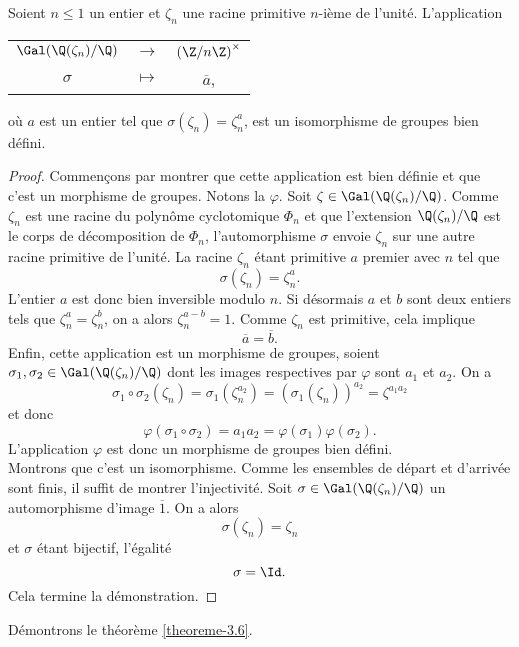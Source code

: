 \begin{lemme}\label{iso-Z/nZ*}
	Soient $n \leq 1$ un entier et $\zeta_n$ une racine primitive $n$-ième de l'unité. L'application 
\begin{center}
	\begin{tabular}{ccc}
		$\Gal(\Q(\zeta_n)/\Q)$ & $\longrightarrow$ & $\left(\Z/n\Z\right)^\times$ \\
		$\sigma$	& $\longmapsto$ & $\overline{a}$,
	\end{tabular}
\end{center}
où $a$ est un entier tel que $\sigma(\zeta_n) = \zeta_n^a$, est un isomorphisme de groupes bien défini.
\end{lemme}

\begin{proof}
	Commençons par montrer que cette application est bien définie et que c'est un morphisme de groupes. Notons la $\varphi$. Soit $\zeta\in \Gal(\Q(\zeta_n)/\Q)$. Comme $\zeta_n$ est une racine du polynôme cyclotomique $\Phi_n$ et que l'extension $\Q(\zeta_n)/\Q$ est le corps de décomposition de $\Phi_n$, l'automorphisme $\sigma$ envoie $\zeta_n$ sur une autre racine primitive de l'unité. La racine $\zeta_n$ étant primitive $a$ premier avec $n$ tel que \[\sigma(\zeta_n) = \zeta_n^a.\] L'entier $a$ est donc bien inversible modulo $n$. Si désormais $a$ et $b$ sont deux entiers tels que $\zeta_n^a = \zeta_n^b$, on a alors $\zeta_n^{a-b} = 1$. Comme $\zeta_n$ est primitive, cela implique \[\overline{a} = \overline{b}.\] Enfin, cette application est un morphisme de groupes, soient $\sigma_1, \sigma_2 \in \Gal(\Q(\zeta_n)/\Q)$ dont les images respectives par $\varphi$ sont $a_1$ et $a_2$. On a \[\sigma_1\circ \sigma_2(\zeta_n) = \sigma_1(\zeta_n^{a_2}) = (\sigma_1(\zeta_n))^{a_2} = \zeta^{a_1 a_2}\] et donc \[\varphi(\sigma_1\circ\sigma_2) = a_1 a_2 = \varphi(\sigma_1)\varphi(\sigma_2).\] L'application $\varphi$ est donc un morphisme de groupes bien défini. \\

	Montrons que c'est un isomorphisme. Comme les ensembles de départ et d'arrivée sont finis, il suffit de montrer l'injectivité. Soit $\sigma\in \Gal(\Q(\zeta_n)/\Q)$ un automorphisme d'image $\overline{1}$. On a alors \[\sigma(\zeta_n) = \zeta_n\] et $\sigma$ étant bijectif, l'égalité \[\sigma = \Id.\] Cela termine la démonstration.
\end{proof}


Démontrons le théorème \ref{theoreme-3.6}.

